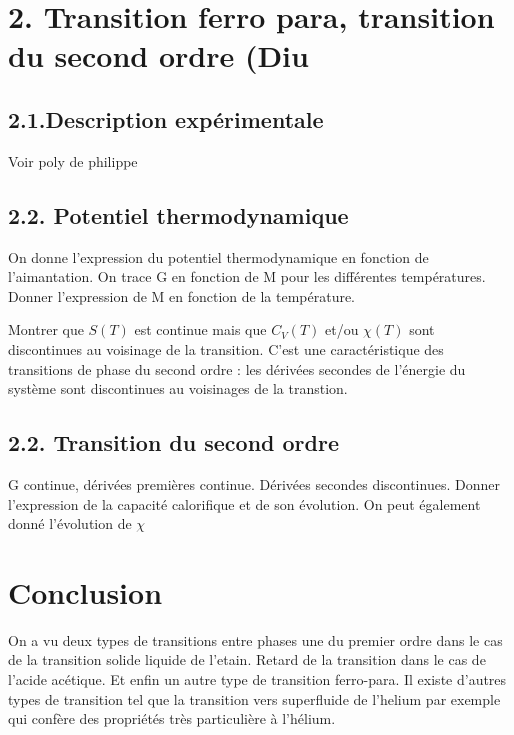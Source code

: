 \documentclass[french, a4paper, 10pt, twocolumn, landscape]{article}
\begin{document}


\section*{2. Transition ferro para, transition du second ordre (Diu}
\subsection*{2.1.Description expérimentale }

Voir poly de philippe

\subsection*{2.2. Potentiel thermodynamique}

On donne l'expression du potentiel thermodynamique en fonction de l'aimantation. On trace G en fonction de M pour les différentes températures. Donner l'expression de M en fonction de la température. 


Montrer que $S(T)$ est continue mais que $C_V(T)$ et/ou $\chi(T)$ sont discontinues au voisinage de la transition. C'est une caractéristique des transitions de phase du second ordre : les dérivées secondes de l'énergie du système sont discontinues au voisinages de la transtion.
\subsection*{2.2. Transition du second ordre}

G continue, dérivées premières continue. Dérivées secondes discontinues. Donner l'expression de la capacité calorifique et de son évolution. On peut également donné l'évolution de $\chi$

\section*{Conclusion}

On a vu deux types de transitions entre phases une du premier ordre dans le cas de la transition solide liquide de l'etain. Retard de la transition dans le cas de l'acide acétique. Et enfin un autre type de transition ferro-para. Il existe d'autres types de transition tel que la transition vers superfluide de l'helium par exemple qui confère des propriétés très particulière à l'hélium.

\clearpage
\end{document}
